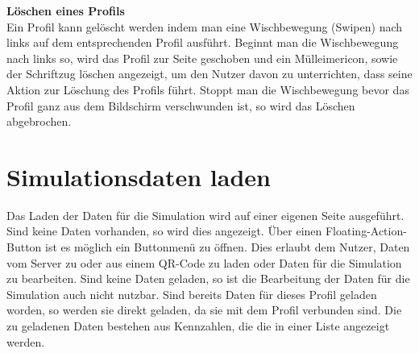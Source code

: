 	\textbf{Löschen eines Profils}\\
	Ein Profil kann gelöscht werden indem man eine Wischbewegung (Swipen) nach links auf dem entsprechenden Profil ausführt. Beginnt man die Wischbewegung nach links so, wird das Profil zur Seite geschoben und ein Mülleimericon, sowie der Schriftzug \glqq löschen\grqq{} angezeigt, um den Nutzer davon zu unterrichten, dass seine Aktion zur Löschung des Profils führt. Stoppt man die Wischbewegung bevor das Profil ganz aus dem Bildschirm verschwunden ist, so wird das Löschen abgebrochen.
	

	
	\section{Simulationsdaten laden}
	\label{sec:load-sim-data}
	
	Das Laden der Daten für die Simulation wird auf einer eigenen Seite ausgeführt. Sind keine Daten vorhanden, so wird dies angezeigt. Über einen Floating-Action-Button  ist es möglich ein Buttonmenü zu öffnen. Dies erlaubt dem Nutzer, Daten vom Server zu oder aus einem QR-Code zu laden oder Daten für die Simulation zu bearbeiten. Sind keine Daten geladen, so ist die Bearbeitung der Daten für die Simulation auch nicht nutzbar. Sind bereits Daten für dieses Profil geladen worden, so werden sie direkt geladen, da sie mit dem Profil verbunden sind. Die zu geladenen Daten bestehen aus Kennzahlen, die die in einer Liste angezeigt werden.
	
	

